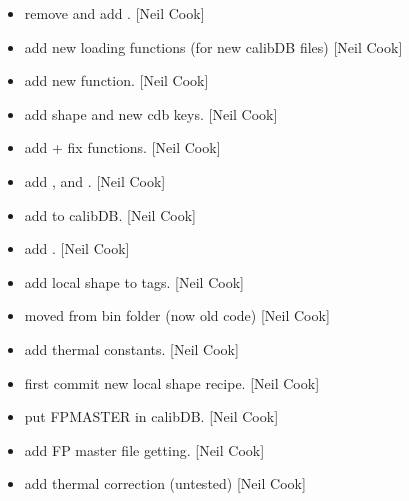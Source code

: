 \documentclass[a4paper,10pt,english]{report}
\begin{document}
\label{\detokenize{misc/changelog:id143}}\begin{itemize}
\item {} 
 \sphinxhyphen{} remove  and add
. {[}Neil Cook{]}

\item {} 
 \sphinxhyphen{} add new loading functions (for new calibDB files)
{[}Neil Cook{]}

\item {} 
 \sphinxhyphen{} add new  function. {[}Neil
Cook{]}

\item {} 
 \sphinxhyphen{} add shape and new cdb keys. {[}Neil Cook{]}

\item {} 
 \sphinxhyphen{} add  + fix  functions.
{[}Neil Cook{]}

\item {} 
 \sphinxhyphen{} add ,  and
. {[}Neil Cook{]}

\item {} 
 \sphinxhyphen{} add  to calibDB. {[}Neil Cook{]}

\item {} 
 \sphinxhyphen{} add . {[}Neil Cook{]}

\item {} 
 \sphinxhyphen{} add local shape to tags. {[}Neil Cook{]}

\item {} 
 \sphinxhyphen{} moved from bin folder (now old code) {[}Neil Cook{]}

\item {} 
 \sphinxhyphen{} add thermal constants. {[}Neil Cook{]}

\item {} 
 \sphinxhyphen{} first commit new local shape recipe. {[}Neil Cook{]}

\item {} 
 \sphinxhyphen{} put FPMASTER in calibDB. {[}Neil Cook{]}

\item {} 
 \sphinxhyphen{} add FP master file getting. {[}Neil Cook{]}

\item {} 
 \sphinxhyphen{} add thermal correction (untested) {[}Neil
Cook{]}

\end{itemize}
\end{document}
